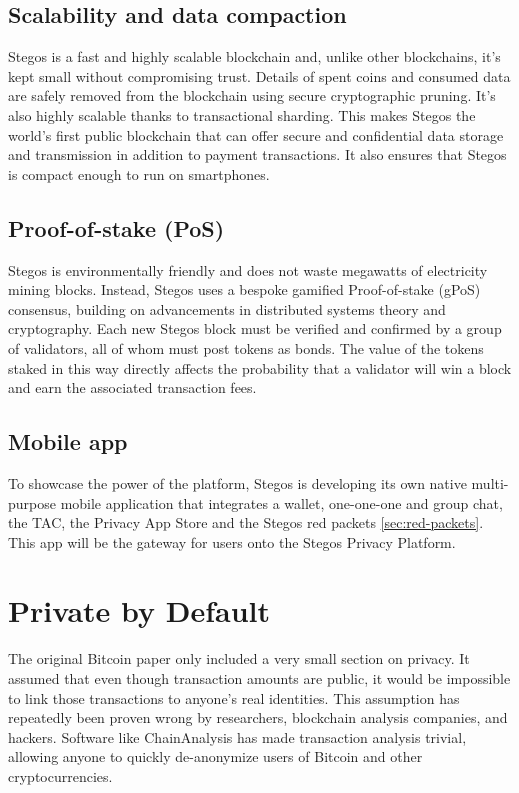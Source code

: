 \documentclass[8pt,fleqn,openany]{book}
\begin{document}
	\subsection{Scalability and data compaction}
	Stegos is a fast and highly scalable blockchain and, unlike other blockchains, it’s kept small without compromising trust. Details of spent coins and consumed data are safely removed from the blockchain using secure cryptographic pruning. It's also highly scalable thanks to transactional sharding. This makes Stegos the world’s first public blockchain that can offer secure and confidential data storage and transmission in addition to payment transactions. It also ensures that Stegos is compact enough to run on smartphones.
	
	\subsection{Proof-of-stake (PoS)}
	Stegos is environmentally friendly and does not waste megawatts of electricity mining blocks. Instead, Stegos uses a bespoke gamified Proof-of-stake (gPoS) consensus, building on advancements in distributed systems theory and cryptography. Each new Stegos block must be verified and confirmed by a group of validators, all of whom must post tokens as bonds. The value of the tokens staked in this way directly affects the probability that a validator will win a block and earn the associated transaction fees.
	
	\subsection{Mobile app}
	To showcase the power of the platform, Stegos is developing its own native multi-purpose mobile application that integrates a wallet, one-one-one and group chat, the TAC, the Privacy App Store and the Stegos red packets \ref{sec:red-packets}. This app will be the gateway for users onto the Stegos Privacy Platform.
	
	
	\section{Private by Default}
	The original Bitcoin paper only included a very small section on privacy\cite{c1}. It assumed that even though transaction amounts are public, it would be impossible to link those transactions to anyone’s real identities. This assumption has repeatedly been proven wrong by researchers, blockchain analysis companies, and hackers. Software like ChainAnalysis has made transaction analysis trivial, allowing anyone to quickly de-anonymize users of Bitcoin and other cryptocurrencies.
	
\end{document}
